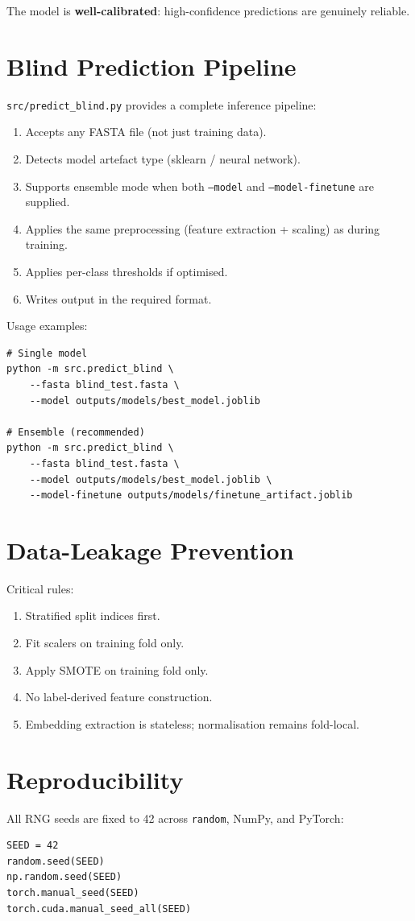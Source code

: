 \documentclass[11pt,a4paper]{article}
\begin{document}
The model is \textbf{well-calibrated}: high-confidence predictions are genuinely reliable.

\section{Blind Prediction Pipeline}
\texttt{src/predict\_blind.py} provides a complete inference pipeline:
\begin{enumerate}
\item Accepts any FASTA file (not just training data).
\item Detects model artefact type (sklearn / neural network).
\item Supports ensemble mode when both \texttt{--model} and \texttt{--model-finetune} are supplied.
\item Applies the same preprocessing (feature extraction + scaling) as during training.
\item Applies per-class thresholds if optimised.
\item Writes output in the required format.
\end{enumerate}

Usage examples:
\begin{verbatim}
# Single model
python -m src.predict_blind \
    --fasta blind_test.fasta \
    --model outputs/models/best_model.joblib

# Ensemble (recommended)
python -m src.predict_blind \
    --fasta blind_test.fasta \
    --model outputs/models/best_model.joblib \
    --model-finetune outputs/models/finetune_artifact.joblib
\end{verbatim}

\section{Data-Leakage Prevention}
Critical rules:
\begin{enumerate}
\item Stratified split indices first.
\item Fit scalers on training fold only.
\item Apply SMOTE on training fold only.
\item No label-derived feature construction.
\item Embedding extraction is stateless; normalisation remains fold-local.
\end{enumerate}

\section{Reproducibility}
All RNG seeds are fixed to 42 across \texttt{random}, NumPy, and PyTorch:
\begin{verbatim}
SEED = 42
random.seed(SEED)
np.random.seed(SEED)
torch.manual_seed(SEED)
torch.cuda.manual_seed_all(SEED)
\end{verbatim}
\end{document}
